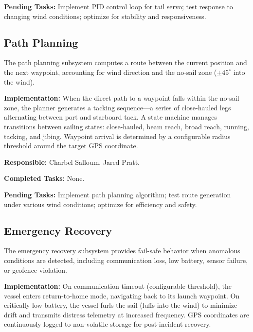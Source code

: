 \textbf{Pending Tasks:} Implement PID control loop for tail servo; test response to changing wind conditions; optimize for stability and responsiveness.


\subsection{Path Planning}

The path planning subsystem computes a route between the current position and the next waypoint, accounting for wind direction and the no-sail zone ($\pm45^{\circ}$ into the wind).

\textbf{Implementation:} When the direct path to a waypoint falls within the no-sail zone, the planner generates a tacking sequence---a series of close-hauled legs alternating between port and starboard tack. A state machine manages transitions between sailing states: close-hauled, beam reach, broad reach, running, tacking, and jibing. Waypoint arrival is determined by a configurable radius threshold around the target GPS coordinate.

\textbf{Responsible:} Charbel Salloum, Jared Pratt.

\textbf{Completed Tasks:} None.

\textbf{Pending Tasks:} Implement path planning algorithm; test route generation under various wind conditions; optimize for efficiency and safety.


\subsection{Emergency Recovery}

The emergency recovery subsystem provides fail-safe behavior when anomalous conditions are detected, including communication loss, low battery, sensor failure, or geofence violation.

\textbf{Implementation:} On communication timeout (configurable threshold), the vessel enters return-to-home mode, navigating back to its launch waypoint. On critically low battery, the vessel furls the sail (luffs into the wind) to minimize drift and transmits distress telemetry at increased frequency. GPS coordinates are continuously logged to non-volatile storage for post-incident recovery.

